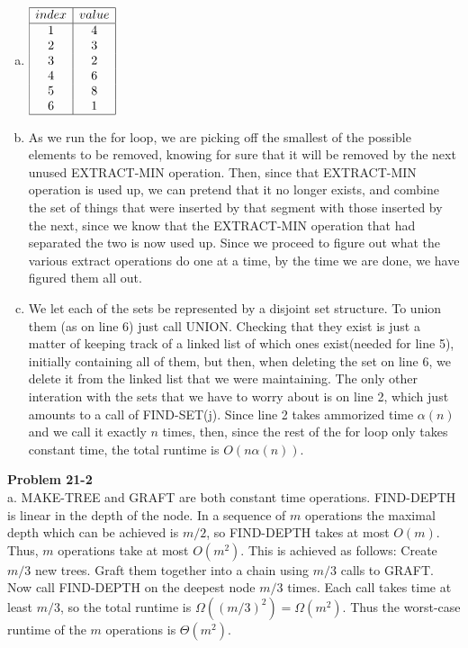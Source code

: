 \documentclass{article}
\begin{document}
\begin{enumerate}[a.]
\item
$
\begin{array}{|c|c|}
\hline
index&value\\
\hline
1&4\\
2&3\\
3&2\\
4&6\\
5&8\\
6&1\\
\hline
\end{array}
$

\item
As we run the for loop, we are picking off the smallest of the possible elements to be removed, knowing for sure that it will be removed by the next unused EXTRACT-MIN operation. Then, since that EXTRACT-MIN operation is used up, we can pretend that it no longer exists, and combine the set of things that were inserted by that segment with those inserted by the next, since we know that the EXTRACT-MIN operation that had separated the two is now used up. Since we proceed to figure out what the various extract operations do one at a time, by the time we are done, we have figured them all out.

\item
We let each of the sets be represented by a disjoint set structure. To union them (as on line 6) just call UNION. Checking that they exist is just a matter of keeping track of a linked list of which ones exist(needed for line 5), initially containing all of them, but then, when deleting the set on line 6, we delete it from the linked list that we were maintaining. The only other interation with the sets that we have to worry about is on line 2, which just amounts to a call of FIND-SET(j). Since line 2 takes ammorized time $\alpha(n)$ and we call it exactly $n$ times, then, since the rest of the for loop only takes constant time, the total runtime is $O(n\alpha(n))$.

\end{enumerate}

\noindent\textbf{Problem 21-2}\\

a. MAKE-TREE and GRAFT are both constant time operations.  FIND-DEPTH is linear in the depth of the node.  In a sequence of $m$ operations the maximal depth which can be achieved is $m/2$, so FIND-DEPTH takes at most $O(m)$.  Thus, $m$ operations take at most $O(m^2)$.  This is achieved as follows: Create $m/3$ new trees.  Graft them together into a chain using $m/3$ calls to GRAFT.  Now call FIND-DEPTH on the deepest node $m/3$ times.  Each call takes time at least $m/3$, so the total runtime is $\Omega((m/3)^2) = \Omega(m^2)$.  Thus the worst-case runtime of the $m$ operations is $\Theta(m^2)$. \\
\end{document}
